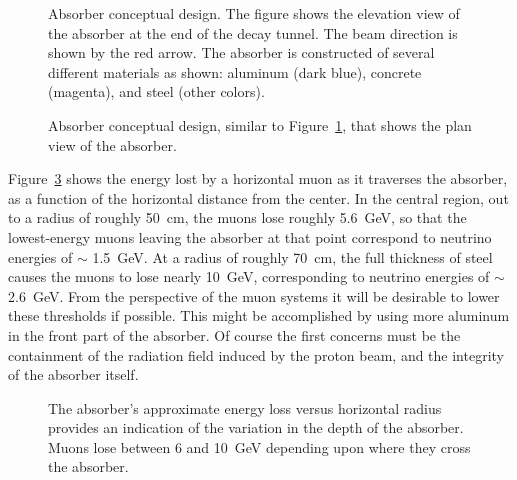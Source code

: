 \begin{figure}[htbp]
\begin{center}
\centering
\caption[Absorber conceptual design, elevation view]{ Absorber conceptual design. The figure shows
the elevation view of the absorber at the end of the decay tunnel. The beam direction is shown by
the red arrow. The absorber is constructed of several different materials as shown: aluminum (dark blue), concrete (magenta), and steel (other colors). } 
\label{fig:AbsorberDetailElev}
\end{center}
\end{figure}

\begin{figure}[htbp]
\begin{center}
\centering
\caption[Absorber conceptual design, plan view]{Absorber conceptual design, 
similar to Figure~\ref{fig:AbsorberDetailElev}, that 
shows the plan view of the absorber.} 
\label{fig:AbsorberDetailPlan}
\end{center}
\end{figure}


Figure~\ref{fig:AbsorberDepthVsRadius} shows the energy lost by a
horizontal muon as it traverses the absorber, as a function of the
horizontal distance from the center. In the central region, out to a
radius of roughly 50~cm, the muons lose roughly 5.6~GeV, so that the
lowest-energy muons leaving the absorber at that point correspond to
neutrino energies of $\sim$ 1.5~GeV. At a radius of roughly 70~cm, the
full thickness of steel causes the muons to lose nearly 10~GeV,
corresponding to neutrino energies of $\sim$ 2.6~GeV. From the
perspective of the muon systems it will be desirable to lower these
thresholds if possible. This might be accomplished by using more
aluminum in the front part of the absorber. Of course the first
concerns must be the containment of the radiation field induced by the
proton beam, and the integrity of the absorber itself. 

\begin{figure}[htbp]
\begin{center}
\centering
\caption[Energy loss in absorber]{The absorber's approximate
energy loss versus horizontal radius provides an indication of the variation in 
the depth of the absorber. Muons lose between 6 and 10~GeV depending upon where they cross the absorber. }
\label{fig:AbsorberDepthVsRadius}
\end{center}
\end{figure}

